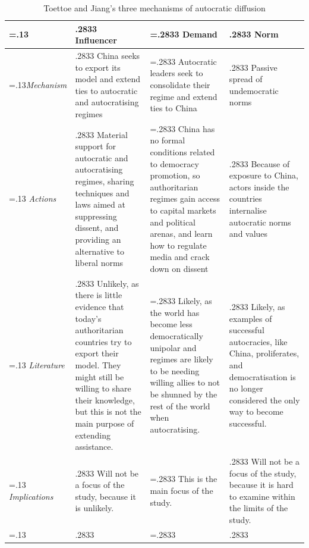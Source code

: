 \begin{table}[!hbt]
\centering
\caption{\label{tab:mechanism}Toettoe and Jiang's three mechanisms of autocratic diffusion}
\vspace{0.5em}
\begin{tabularx}{1\textwidth} {
 >{\noindent\justifying\arraybackslash\hsize=.13\hsize}X 
 >{\noindent\justifying\arraybackslash\hsize.2833\hsize}X 
 >{\noindent\justifying\arraybackslash\hsize=.2833\hsize}X 
 >{\noindent\justifying\arraybackslash\hsize.2833\hsize}X}
\toprule
& \textbf{Influencer} 
& \textbf{Demand}
& \textbf{Norm} \\
\midrule
\textit{Mechanism}
& China seeks to export its model and extend ties to autocratic and autocratising regimes 
& Autocratic leaders seek to consolidate their regime and extend ties to China 
& Passive spread of undemocratic norms \\
\addlinespace
\textit{Actions} 
& Material support for autocratic and autocratising regimes, sharing techniques and laws aimed at suppressing dissent, and providing an alternative to liberal norms 
& China has no formal conditions related to democracy promotion, so authoritarian regimes gain access to capital markets and political arenas, and learn how to regulate media and crack down on dissent 
& Because of exposure to China, actors inside the countries internalise autocratic norms and values \\
\addlinespace
\textit{Literature }
& Unlikely, as there is little evidence that today's authoritarian countries try to export their model. They might still be willing to share their knowledge, but this is not the main purpose of extending assistance.
& Likely, as the world has become less democratically unipolar and regimes are likely to be needing willing allies to not be shunned by the rest of the world when autocratising.
& Likely, as examples of successful autocracies, like China, proliferates, and democratisation is no longer considered the only way to become successful.\\
\addlinespace
\textit{Implications}
& Will not be a focus of the study, because it is unlikely.
& This is the main focus of the study.
& Will not be a focus of the study, because it is hard to examine within the limits of the study. \\
\bottomrule

 \multicolumn{4}{p{\textwidth}}{\raggedright{\textit{Mechanisms are found in \citet[pp. 29-31]{toettoe_foreign_2023}}}}

\end{tabularx}
\end{table}

